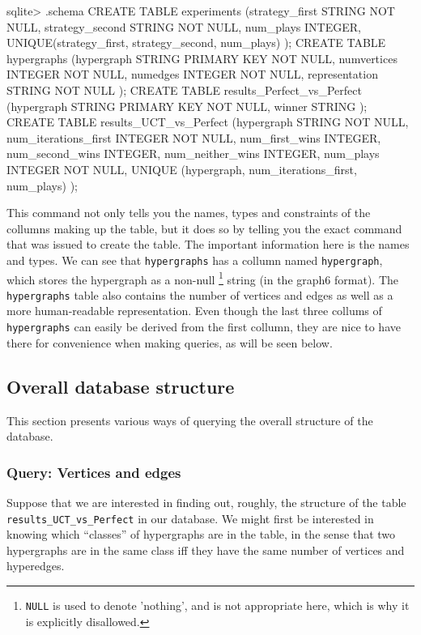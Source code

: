 \begin{minipage}{\linewidth}
\begin{code}
sqlite> .schema
CREATE TABLE experiments
(strategy_first STRING NOT NULL,
 strategy_second STRING NOT NULL,
 num_plays INTEGER,
 UNIQUE(strategy_first, strategy_second, num_plays)
);
CREATE TABLE hypergraphs
(hypergraph STRING PRIMARY KEY NOT NULL,
 numvertices INTEGER NOT NULL,
 numedges INTEGER NOT NULL,
 representation STRING NOT NULL
);
CREATE TABLE results_Perfect_vs_Perfect
(hypergraph STRING PRIMARY KEY NOT NULL,
 winner STRING
);
CREATE TABLE results_UCT_vs_Perfect
(hypergraph STRING NOT NULL,
 num_iterations_first INTEGER NOT NULL,
 num_first_wins INTEGER,
 num_second_wins INTEGER,
 num_neither_wins INTEGER,
 num_plays INTEGER NOT NULL,
 UNIQUE (hypergraph, num_iterations_first, num_plays)
);
\end{code}
\end{minipage}
This command not only tells you the names, types and constraints of the collumns making up the table, but it does so by telling you the exact command that was issued to create the table.
The important information here is the names and types.
We can see that \texttt{hypergraphs} has a collumn named \texttt{hypergraph}, which stores the hypergraph as a non-null \footnote{\texttt{NULL} is used to denote 'nothing', and is not appropriate here, which is why it is explicitly disallowed.} string (in the graph6 format). 
The \texttt{hypergraphs} table also contains the number of vertices and edges as well as a more human-readable representation.
Even though the last three collums of \texttt{hypergraphs} can easily be derived from the first collumn, they are nice to have there for convenience when making queries, as will be seen below.


\subsection{Overall database structure}


This section presents various ways of querying the overall structure of the database.

\subsubsection{Query: Vertices and edges}

Suppose that we are interested in finding out, roughly, the structure of the table \texttt{results\_UCT\_vs\_Perfect} in our database.
We might first be interested in knowing which ``classes'' of hypergraphs are in the table, in the sense that two hypergraphs are in the same class iff they have the same number of vertices and hyperedges.

